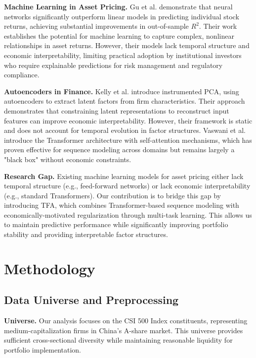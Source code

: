 \documentclass[12pt]{article}
\begin{document}
\textbf{Machine Learning in Asset Pricing.} Gu et al. \cite{gu2020empirical} demonstrate that neural networks significantly outperform linear models in predicting individual stock returns, achieving substantial improvements in out-of-sample $R^2$. Their work establishes the potential for machine learning to capture complex, nonlinear relationships in asset returns. However, their models lack temporal structure and economic interpretability, limiting practical adoption by institutional investors who require explainable predictions for risk management and regulatory compliance.

\textbf{Autoencoders in Finance.} Kelly et al. \cite{kelly2019characteristics} introduce instrumented PCA, using autoencoders to extract latent factors from firm characteristics. Their approach demonstrates that constraining latent representations to reconstruct input features can improve economic interpretability. However, their framework is static and does not account for temporal evolution in factor structures. Vaswani et al. \cite{vaswani2017attention} introduce the Transformer architecture with self-attention mechanisms, which has proven effective for sequence modeling across domains but remains largely a "black box" without economic constraints.

\textbf{Research Gap.} Existing machine learning models for asset pricing either lack temporal structure (e.g., feed-forward networks) or lack economic interpretability (e.g., standard Transformers). Our contribution is to bridge this gap by introducing TFA, which combines Transformer-based sequence modeling with economically-motivated regularization through multi-task learning. This allows us to maintain predictive performance while significantly improving portfolio stability and providing interpretable factor structures.

\section{Methodology}

\subsection{Data Universe and Preprocessing}

\textbf{Universe.} Our analysis focuses on the CSI 500 Index constituents, representing medium-capitalization firms in China's A-share market. This universe provides sufficient cross-sectional diversity while maintaining reasonable liquidity for portfolio implementation.
\end{document}
